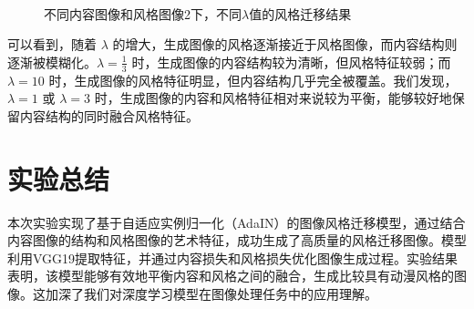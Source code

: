 \documentclass[UTF8,openany]{ctexbook}
\begin{document}
\begin{figure}[t]
{    }
    \\
    \caption{不同内容图像和风格图像2下，不同$\lambda$值的风格迁移结果}
    \vspace{-3ex}
    \label{fig:style2}
\end{figure}

可以看到，随着 $\lambda$ 的增大，生成图像的风格逐渐接近于风格图像，而内容结构则逐渐被模糊化。$\lambda = \frac{1}{3}$ 时，生成图像的内容结构较为清晰，但风格特征较弱；而 $\lambda = 10$ 时，生成图像的风格特征明显，但内容结构几乎完全被覆盖。我们发现，$\lambda = 1$ 或 $\lambda = 3$ 时，生成图像的内容和风格特征相对来说较为平衡，能够较好地保留内容结构的同时融合风格特征。

\chapter{实验总结}

本次实验实现了基于自适应实例归一化（AdaIN）的图像风格迁移模型，通过结合内容图像的结构和风格图像的艺术特征，成功生成了高质量的风格迁移图像。模型利用VGG19提取特征，并通过内容损失和风格损失优化图像生成过程。实验结果表明，该模型能够有效地平衡内容和风格之间的融合，生成比较具有动漫风格的图像。这加深了我们对深度学习模型在图像处理任务中的应用理解。



\end{document}

